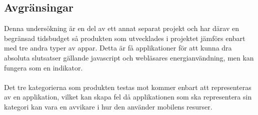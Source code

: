 \subsection{Avgränsingar}
\label{subsec:joel_a-delimitations}

Denna undersökning är en del av ett annat separat projekt och har därav en begränsad tidsbudget så produkten som utvecklades i projektet jämförs enbart med tre andra typer av appar. Detta är få applikationer för att kunna dra absoluta slutsatser gällande javascript och webläsares energianvändning, men kan fungera som en indikator.\\\\
Det tre kategorierna som produkten testas mot kommer enbart att representeras av en applikation, vilket kan skapa fel då applikationen som ska representera sin kategori kan vara en avvikare i hur den använder mobilens resurser.


